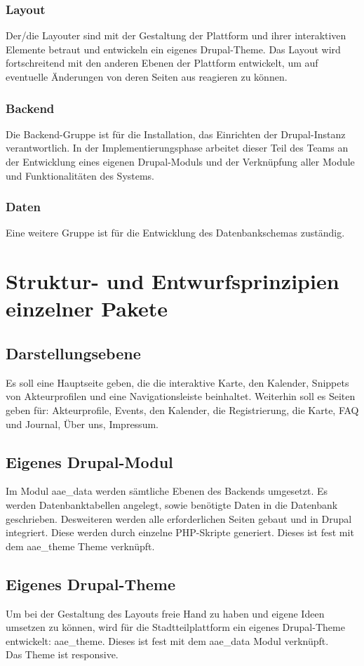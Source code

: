 \documentclass{swp}
\begin{document}
\subsubsection{Layout}
Der/die Layouter sind mit der Gestaltung der Plattform und ihrer interaktiven Elemente betraut und entwickeln ein eigenes Drupal-Theme. Das Layout wird fortschreitend mit den anderen Ebenen der Plattform entwickelt, um auf eventuelle \"Anderungen von deren Seiten aus reagieren zu k\"onnen. 
\subsubsection{Backend}
Die Backend-Gruppe ist f\"ur die Installation, das Einrichten der Drupal-Instanz verantwortlich. In der Implementierungsphase arbeitet dieser Teil des Teams an der Entwicklung eines eigenen Drupal-Moduls und der Verkn\"upfung aller Module und Funktionalit\"aten des Systems.
\subsubsection{Daten}
Eine weitere Gruppe ist f\"ur die Entwicklung des Datenbankschemas zust\"andig.
\section{Struktur- und Entwurfsprinzipien einzelner Pakete}
\subsection{Darstellungsebene}
Es soll eine Hauptseite geben, die die interaktive Karte, den Kalender, Snippets von Akteurprofilen und eine Navigationsleiste beinhaltet. Weiterhin soll es Seiten geben f\"ur: Akteurprofile, Events, den Kalender, die Registrierung, die Karte, FAQ und Journal, \"Uber uns, Impressum.
\subsection{Eigenes Drupal-Modul}
Im Modul aae\_{}data werden s\"amtliche Ebenen des Backends umgesetzt. Es werden Datenbanktabellen angelegt, sowie ben\"otigte Daten in die Datenbank geschrieben. Desweiteren werden alle erforderlichen Seiten gebaut und in Drupal integriert. Diese werden durch einzelne PHP-Skripte generiert. Dieses ist fest mit dem aae\_{}theme Theme verkn\"upft.
\subsection{Eigenes Drupal-Theme}
Um bei der Gestaltung des Layouts freie Hand zu haben und eigene Ideen umsetzen zu k\"onnen, wird f\"ur die Stadtteilplattform ein eigenes Drupal-Theme entwickelt: aae\_{}theme. Dieses ist fest mit dem aae\_{}data Modul verkn\"upft.\\
Das Theme ist responsive.
\end{document}
